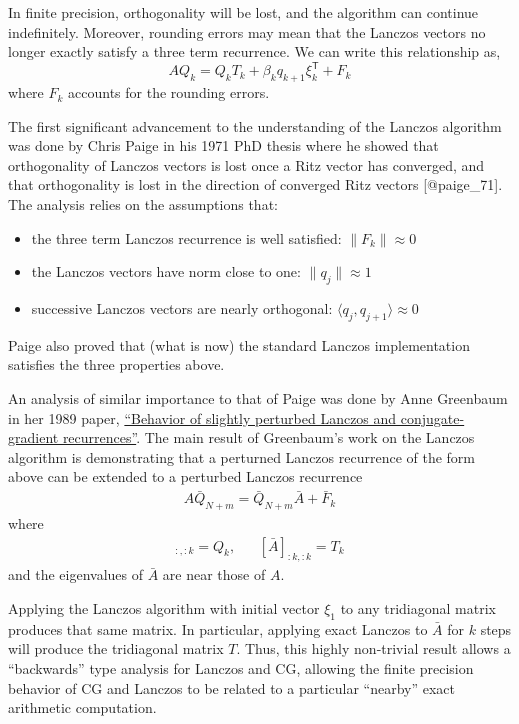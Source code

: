 \documentclass[10pt]{article}
\providecommand{\tightlist}{%
  \setlength{\itemsep}{0pt}\setlength{\parskip}{0pt}}
\begin{document}
In finite precision, orthogonality will be lost, and the algorithm can continue indefinitely.
Moreover, rounding errors may mean that the Lanczos vectors no longer exactly satisfy a three term recurrence.
We can write this relationship as,
\[
AQ_k = Q_k T_k + \beta_k q_{k+1} \xi_k^{\mathsf{T}} + F_k
\]
where \(F_k\) accounts for the rounding errors.

The first significant advancement to the understanding of the Lanczos algorithm was done by Chris Paige in his 1971 PhD thesis where he showed that orthogonality of Lanczos vectors is lost once a Ritz vector has converged, and that orthogonality is lost in the direction of converged Ritz vectors {[}@paige\_71{]}.
The analysis relies on the assumptions that:

\begin{itemize}
\tightlist
\item
  the three term Lanczos recurrence is well satisfied: \(\| F_k \|\approx 0\)
\item
  the Lanczos vectors have norm close to one: \(\|q_j\|\approx 1\)
\item
  successive Lanczos vectors are nearly orthogonal: \(\langle q_j,q_{j+1}\rangle \approx 0\)
\end{itemize}

Paige also proved that (what is now) the standard Lanczos implementation satisfies the three properties above.

An analysis of similar importance to that of Paige was done by Anne Greenbaum in her 1989 paper, \href{https://www.sciencedirect.com/science/article/pii/0024379589902851}{``Behavior of slightly perturbed Lanczos and conjugate-gradient recurrences''}.
The main result of Greenbaum's work on the Lanczos algorithm is demonstrating that a perturned Lanczos recurrence of the form above can be extended to a perturbed Lanczos recurrence
\begin{align*}
    A \bar{Q}_{N+m} = \bar{Q}_{N+m} \bar{A} + \bar{F}_k
\end{align*}
where
\begin{align*}
    [\bar{Q}_{N+m}]_{:,:k} = Q_k
    ,&&
    [\bar{A}]_{:k,:k} = T_k
\end{align*}
and the eigenvalues of \(\bar{A}\) are near those of \(A\).

Applying the Lanczos algorithm with initial vector \(\xi_1\) to any tridiagonal matrix produces that same matrix.
In particular, applying exact Lanczos to \(\bar{A}\) for \(k\) steps will produce the tridiagonal matrix \(T\).
Thus, this highly non-trivial result allows a ``backwards'' type analysis for Lanczos and CG, allowing the finite precision behavior of CG and Lanczos to be related to a particular ``nearby'' exact arithmetic computation.
\end{document}
